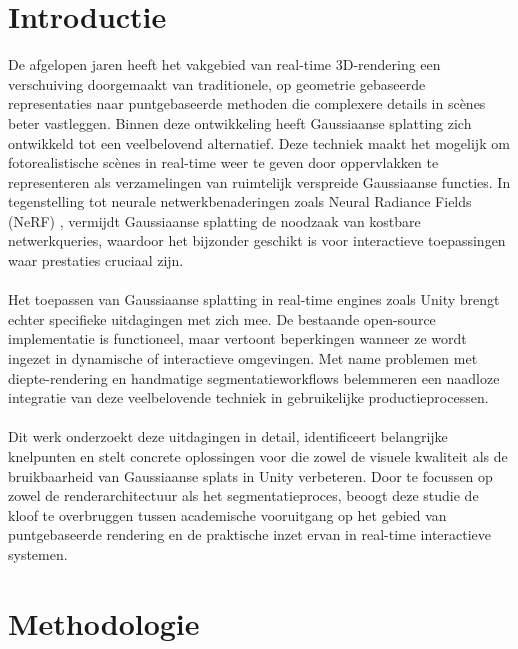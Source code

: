 \documentclass[twocolumn]{article}
\begin{document}
	\section{Introductie}
De afgelopen jaren heeft het vakgebied van real-time 3D-rendering een verschuiving doorgemaakt van traditionele, op geometrie gebaseerde representaties naar puntgebaseerde methoden die complexere details in scènes beter vastleggen. Binnen deze ontwikkeling heeft Gaussiaanse splatting \cite{OriginalSplatting} zich ontwikkeld tot een veelbelovend alternatief. Deze techniek maakt het mogelijk om fotorealistische scènes in real-time weer te geven door oppervlakken te representeren als verzamelingen van ruimtelijk verspreide Gaussiaanse functies. In tegenstelling tot neurale netwerkbenaderingen zoals Neural Radiance Fields (NeRF) \cite{Nerf}, vermijdt Gaussiaanse splatting de noodzaak van kostbare netwerkqueries, waardoor het bijzonder geschikt is voor interactieve toepassingen waar prestaties cruciaal zijn.
\\\\
Het toepassen van Gaussiaanse splatting in real-time engines zoals Unity brengt echter specifieke uitdagingen met zich mee. De bestaande open-source implementatie \cite{Aras} is functioneel, maar vertoont beperkingen wanneer ze wordt ingezet in dynamische of interactieve omgevingen. Met name problemen met diepte-rendering en handmatige segmentatieworkflows belemmeren een naadloze integratie van deze veelbelovende techniek in gebruikelijke productieprocessen.
\\\\
Dit werk onderzoekt deze uitdagingen in detail, identificeert belangrijke knelpunten en stelt concrete oplossingen voor die zowel de visuele kwaliteit als de bruikbaarheid van Gaussiaanse splats in Unity verbeteren. Door te focussen op zowel de renderarchitectuur als het segmentatieproces, beoogt deze studie de kloof te overbruggen tussen academische vooruitgang op het gebied van puntgebaseerde rendering en de praktische inzet ervan in real-time interactieve systemen.
	\section{Methodologie}
\end{document}
